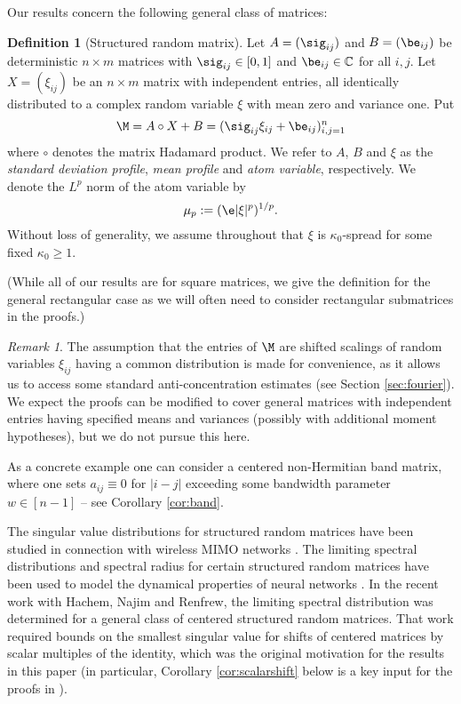 \documentclass[aop,preprint]{imsart}
\theoremstyle{plain}
\theoremstyle{definition}
\newtheorem{definition}[theorem]{Definition}
\theoremstyle{remark}
\newtheorem{remark}[theorem]{Remark}
\numberwithin{equation}{section}
\numberwithin{theorem}{section}
\begin{document}
Our results concern the following general class of matrices:

\begin{definition}[Structured random matrix]	\label{def:profile}
Let $A=(\sig_{ij})$ and $B=(\be_{ij})$ be deterministic $n\times m$ matrices with $\sig_{ij}\in [0,1]$ and $\be_{ij}\in \C$ for all $i,j$.
Let $X=(\xi_{ij})$ be an $n\times m$ matrix with independent entries, all identically distributed to a complex random variable $\xi$ with mean zero and variance one.
Put 
\begin{equation}	\label{Mdef}
\M=A\circ X+B = (\sig_{ij}\xi_{ij}+ \be_{ij})_{i,j=1}^n
\end{equation}
where $\circ$ denotes the matrix Hadamard product.
We refer to $A$, $B$ and $\xi$ as the \emph{standard deviation profile}, \emph{mean profile} and \emph{atom variable}, respectively.
We denote the $L^p$ norm of the atom variable by
\begin{equation}	\label{Lp}
\mu_p:= (\e|\xi|^p)^{1/p}.
\end{equation}
Without loss of generality, we assume throughout that $\xi$ is $\kappa_0$-spread for some fixed $\kappa_0\ge1$.
\end{definition}

(While all of our results are for square matrices, we give the definition for the general rectangular case as we will often need to consider rectangular submatrices in the proofs.)

\begin{remark}	\label{rmk:shiftscale}
The assumption that the entries of $\M$ are shifted scalings of random variables $\xi_{ij}$ having a common distribution is made for convenience, as it allows us to access some standard anti-concentration estimates (see Section \ref{sec:fourier}).
We expect the proofs can be modified to cover general matrices with independent entries having specified means and variances (possibly with additional moment hypotheses), but we do not pursue this here.
\end{remark}

As a concrete example one can consider a centered non-Hermitian band matrix, where one sets $a_{ij}\equiv 0$ for $|i-j|$ exceeding some bandwidth parameter $w\in [n-1]$ -- see Corollary \ref{cor:band}.

The singular value distributions for structured random matrices have been studied in connection with wireless MIMO networks \citep{TuVe:rmt_wireless,HLN:detequiv}.
The limiting spectral distributions and spectral radius for certain structured random matrices have been used to model the dynamical properties of neural networks \citep{RaAb:neural, ARS:block}.
In the recent work \citep{CHNR} with Hachem, Najim and Renfrew, the limiting spectral distribution was determined for a general class of centered structured random matrices.
That work required bounds on the smallest singular value for shifts of centered matrices by scalar multiples of the identity, which was the original motivation for the results in this paper (in particular, Corollary \ref{cor:scalarshift} below is a key input for the proofs in \citep{CHNR}). 
\end{document}
